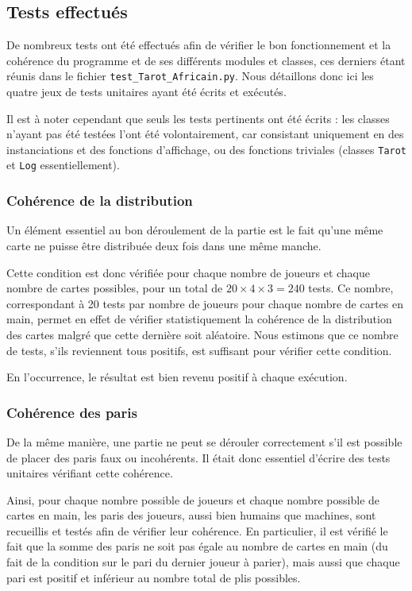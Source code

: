    \subsection{Tests effectués}\label{subsec:tests-effectués}
      De nombreux tests ont été effectués afin de vérifier le bon fonctionnement et la cohérence du programme et de ses différents modules et classes, ces derniers étant réunis dans le fichier \texttt{test\_Tarot\_Africain.py}.
      Nous détaillons donc ici les quatre jeux de tests unitaires ayant été écrits et exécutés.

      Il est à noter cependant que seuls les tests pertinents ont été écrits : les classes n'ayant pas été testées l'ont été volontairement, car consistant uniquement en des instanciations et des fonctions d'affichage, ou des fonctions triviales (classes \texttt{Tarot} et \texttt{Log} essentiellement).

      \subsubsection{Cohérence de la distribution}
         Un élément essentiel au bon déroulement de la partie est le fait qu'une même carte ne puisse être distribuée deux fois dans une même manche.

         Cette condition est donc vérifiée pour chaque nombre de joueurs et chaque nombre de cartes possibles, pour un total de $20\times 4\times 3 = 240$ tests.
         Ce nombre, correspondant à 20 tests par nombre de joueurs pour chaque nombre de cartes en main, permet en effet de vérifier statistiquement la cohérence de la distribution des cartes malgré que cette dernière soit aléatoire.
         Nous estimons que ce nombre de tests, s'ils reviennent tous positifs, est suffisant pour vérifier cette condition.

         En l'occurrence, le résultat est bien revenu positif à chaque exécution.

      \subsubsection{Cohérence des paris}
         De la même manière, une partie ne peut se dérouler correctement s'il est possible de placer des paris faux ou incohérents.
         Il était donc essentiel d'écrire des tests unitaires vérifiant cette cohérence.

         Ainsi, pour chaque nombre possible de joueurs et chaque nombre possible de cartes en main, les paris des joueurs, aussi bien humains que machines, sont recueillis et testés afin de vérifier leur cohérence.
         En particulier, il est vérifié le fait que la somme des paris ne soit pas égale au nombre de cartes en main (du fait de la condition sur le pari du dernier joueur à parier), mais aussi que chaque pari est positif et inférieur au nombre total de plis possibles.

